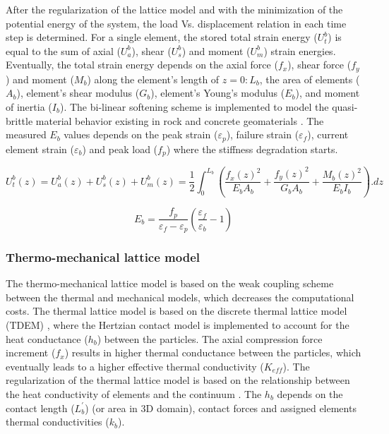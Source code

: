 After the regularization of the lattice model and with the minimization of the potential energy of the system, the load Vs. displacement relation in each time step is determined. For a single element, the stored total strain energy ($U_t^b$) is equal to the sum of axial ($U_a^b$), shear ($U_s^b$) and moment ($U_m^b$) strain energies. Eventually, the total strain energy depends on the axial force ($f_x$), shear force ($f_y$) and moment ($M_b$) along the element's length of $z=0:L_b$, the area of elements ($A_b$), element's shear modulus ($G_b$), element's Young's modulus ($E_b$), and moment of inertia ($I_b$). The bi-linear softening scheme is implemented to model the quasi-brittle material behavior existing in rock and concrete geomaterials \cite{Inceetal2003}. The measured $E_b$ values depends on the peak strain ($\varepsilon_p$), failure  strain ($\varepsilon_f$), current element strain ($\varepsilon_b$) and peak load ($f_p$) where the stiffness degradation starts.

\begin{equation}
\label{eq:LEM_Mechanical_8}
 U_t^b(z)=U_a^b(z)+U_s^b(z)+U_m^b(z)=\frac{1}{2}\int_{0}^{L_b}{\left(\frac{f_x{(z)}^2}{E_b A_b}+\frac{f_y{(z)}^2}{G_b A_b}+\frac{M_b{(z)}^2}{E_b I_b}\right).dz} 
\end{equation}

\begin{equation}
\label{eq:LEM_Mechanical_9}
E_b=\frac{f_p}{\varepsilon_f-\varepsilon_p}\left(\frac{\varepsilon_f}{\varepsilon_b}-1\right)
\end{equation}

\subsubsection*{Thermo-mechanical lattice model}
\label{Section:ThermalLattice}

The thermo-mechanical lattice model is based on the weak coupling scheme between the thermal and mechanical models, which decreases the computational costs. The thermal lattice model is based on the discrete thermal lattice model (TDEM) \cite{Zhangetal2011, Fengetal2008}, where the Hertzian contact model is implemented to account for the heat conductance ($h_b$) between the particles. The axial compression force increment ($f_x$) results in higher thermal conductance between the particles, which eventually leads to a higher effective thermal conductivity ($K_{eff}$). The regularization of the thermal lattice model is based on the relationship between the heat conductivity of elements and the continuum \cite{Rizvietal2018b}. The $h_b$ depends on the contact length ($L_b^\prime$) (or area in 3D domain), contact forces and assigned elements thermal conductivities ($k_{b}$).


